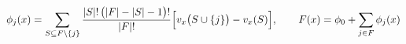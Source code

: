 \begin{equation}
\phi_j(x) = \sum_{S \subseteq F \setminus \{j\}} \frac{|S|!\,\bigl(|F| - |S| - 1\bigr)!}{|F|!}\Bigl[v_x\bigl(S \cup \{j\}\bigr) - v_x(S)\Bigr],
\qquad F(x) = \phi_0 + \sum_{j \in F} \phi_j(x)
\end{equation}
